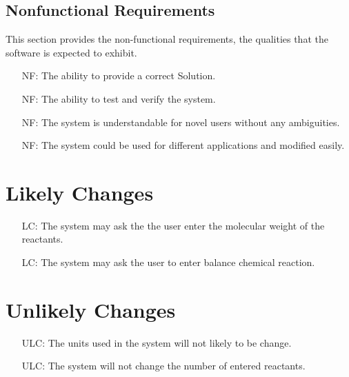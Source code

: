 \documentclass[12pt]{article}
\newcounter{reqnum} %
\newcounter{nfreqnum} %
\newcounter{lcnum} %
\newcounter{ulcnum} %
\begin{document}
\subsection{Nonfunctional Requirements}

This section provides the non-functional requirements, the qualities that the software is
expected to exhibit.\\

\noindent \begin{itemize}
\item[NF\refstepcounter{nfreqnum}\thenfreqnum \label{Accuracy}:]  The ability to provide a correct Solution.\\
\item[NF\refstepcounter{nfreqnum}\thenfreqnum \label{Verify}:]  The ability to test and verify the system.\\
\item[NF\refstepcounter{nfreqnum}\thenfreqnum \label{Understandability}:]  The system is understandable for novel users without any ambiguities.\\
\item[NF\refstepcounter{nfreqnum}\thenfreqnum \label{Usability}:]  The system could be used for different applications and modified easily.\\

\end{itemize}

\section{Likely Changes}    

\noindent \begin{itemize}

\item[LC\refstepcounter{lcnum}\thelcnum\label{Molecular weight}:] The system may ask the the user enter the molecular weight of the reactants.
\item[LC\refstepcounter{lcnum}\thelcnum\label{balance}:] The system may ask the user to enter balance chemical reaction.



\end{itemize}

\section{Unlikely Changes}    

\noindent \begin{itemize}

\item[ULC\refstepcounter{ulcnum}\theulcnum\label{Units}:] The units used in the system will not likely to be change.
\item[ULC\refstepcounter{ulcnum}\theulcnum\label{reactant}:] The system will not change the number of entered reactants. 

\end{itemize}
\end{document}
